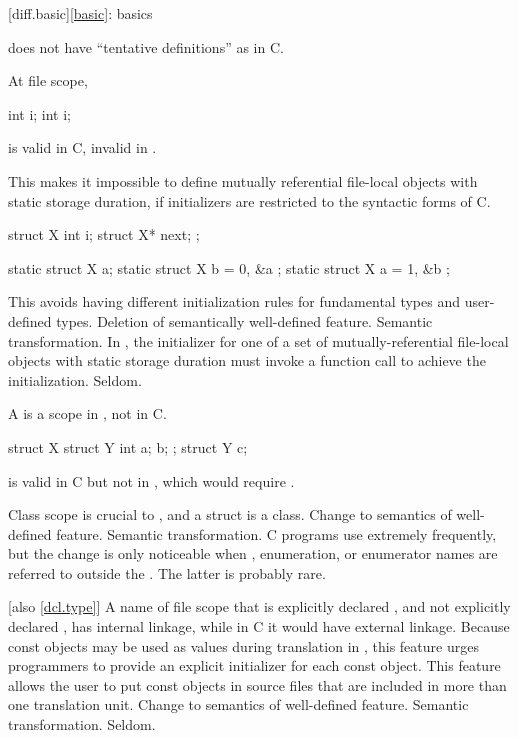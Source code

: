 [diff.basic]{\ref*{basic}: basics}

\change
\Cpp{} does not have ``tentative definitions'' as in C.
\begin{example}
At file scope,
\begin{codeblock}
int i;
int i;
\end{codeblock}
is valid in C, invalid in \Cpp{}.
\end{example}
This makes it impossible to define
mutually referential file-local objects with static storage duration,
if initializers are restricted to the syntactic forms of C\@.
\begin{example}
\begin{codeblock}
struct X { int i; struct X* next; };

static struct X a;
static struct X b = { 0, &a };
static struct X a = { 1, &b };
\end{codeblock}
\end{example}
\rationale
This avoids having different initialization rules for
fundamental types and user-defined types.
\effect
Deletion of semantically well-defined feature.
\difficulty
Semantic transformation.
In \Cpp{}, the initializer for one of a set of
mutually-referential file-local objects with static storage
duration must invoke a function
call to achieve the initialization.
\howwide
Seldom.

\change
A  is a scope in \Cpp{}, not in C.
\begin{example}
\begin{codeblock}
struct X {
  struct Y { int a; } b;
};
struct Y c;
\end{codeblock}
is valid in C but not in \Cpp{}, which would require .
\end{example}
\rationale
Class scope is crucial to \Cpp{}, and a struct is a class.
\effect
Change to semantics of well-defined feature.
\difficulty
Semantic transformation.
\howwide
C programs use  extremely frequently, but the
change is only noticeable when , enumeration, or enumerator
names are referred to outside the .
The latter is probably rare.

 [also \ref{dcl.type}]
\change
A name of file scope that is explicitly declared , and not explicitly
declared , has internal linkage, while in C it would have external linkage.
\rationale
Because const objects may be used as values during translation in
\Cpp{}, this feature urges programmers to provide an explicit initializer
for each const object.
This feature allows the user to put const objects in source files that are included
in more than one translation unit.
\effect
Change to semantics of well-defined feature.
\difficulty
Semantic transformation.
\howwide
Seldom.

